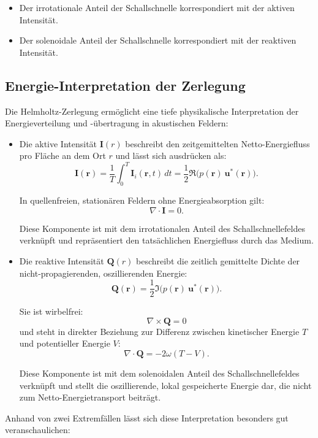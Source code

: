 \begin{itemize}
\item
Der irrotationale Anteil der Schallschnelle korrespondiert mit der
aktiven Intensität.
\item
Der solenoidale Anteil der Schallschnelle korrespondiert mit der
reaktiven Intensität.
\end{itemize}

\subsection{Energie-Interpretation der Zerlegung
\label{helmholtz:Energie_Interpretation}}
Die Helmholtz-Zerlegung ermöglicht eine tiefe physikalische
Interpretation der Energieverteilung und -übertragung in akustischen
%
%
Feldern:
\begin{itemize}
\item
Die aktive Intensität $\boldsymbol{I}(r)$ beschreibt den zeitgemittelten
Netto-Energiefluss pro Fläche an dem Ort $r$ und lässt sich ausdrücken
als:
\begin{equation*}
\boldsymbol{I}(\boldsymbol{r})
=
\frac{1}{T}\int_0^T \boldsymbol{I}_i(\boldsymbol{r},t)\,dt
=
\frac{1}{2}\Re\bigl( p(\boldsymbol{r})~\boldsymbol{u}^*(\boldsymbol{r})\bigr).
\end{equation*}
 
In quellenfreien, stationären Feldern ohne Energieabsorption gilt:
\begin{equation*}
\nabla \cdot \boldsymbol{I}
=
0.
\end{equation*}
 
Diese Komponente ist mit dem irrotationalen Anteil des Schallschnellefeldes verknüpft und repräsentiert den tatsächlichen Energiefluss durch das Medium.
 
\item Die reaktive Intensität $\boldsymbol{Q}(r)$ beschreibt die zeitlich gemittelte Dichte der nicht-pro\-pa\-gie\-ren\-den, oszillierenden Energie:
%
\begin{equation*}
\boldsymbol{Q}(\boldsymbol{r})
=
\frac{1}{2}\Im\bigl(p(\boldsymbol{r})~\boldsymbol{u}^*(\boldsymbol{r})\bigr).
\end{equation*}
 
Sie ist wirbelfrei:
\begin{equation*}
\nabla \times \boldsymbol{Q}
=
0
\end{equation*}
und steht in direkter Beziehung zur Differenz zwischen kinetischer
Energie $T$ und potentieller Energie $V$:
\begin{equation*}
\nabla \cdot \boldsymbol{Q}
=
-2 \omega (T-V).
\end{equation*}
 
Diese Komponente ist mit dem solenoidalen Anteil des Schallschnellefeldes verknüpft und stellt die oszillierende, lokal gespeicherte Energie dar, die nicht zum Netto-Energietransport beiträgt.
\end{itemize}
Anhand von zwei Extremfällen lässt sich diese Interpretation besonders gut veranschaulichen:

